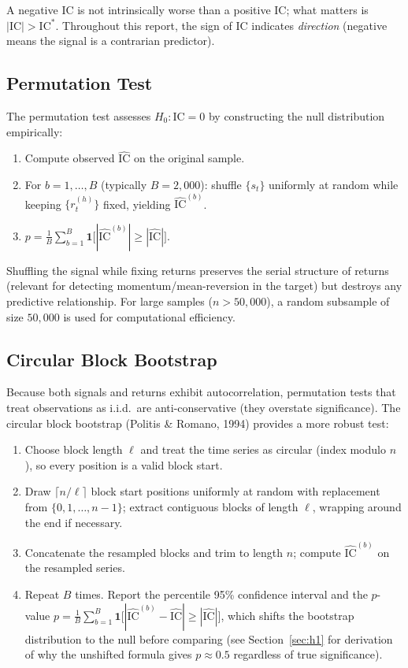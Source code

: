 \documentclass[12pt, a4paper]{article}
\theoremstyle{definition}
\newcommand{\IC}{\mathrm{IC}}
\begin{document}
A negative IC is not intrinsically worse than a positive IC; what matters is
$|\IC| > \IC^*$. Throughout this report, the sign of IC indicates
\emph{direction} (negative means the signal is a contrarian predictor).

\subsection{Permutation Test}

The permutation test assesses $H_0 : \IC = 0$ by constructing the null
distribution empirically:

\begin{enumerate}
  \item Compute observed $\widehat{\IC}$ on the original sample.
  \item For $b = 1,\ldots,B$ (typically $B = 2{,}000$): shuffle $\{s_t\}$
        uniformly at random while keeping $\{r_t^{(h)}\}$ fixed, yielding
        $\widehat{\IC}^{(b)}$.
  \item $p = \frac{1}{B}\sum_{b=1}^B \mathbf{1}\bigl[|\widehat{\IC}^{(b)}|
        \geq |\widehat{\IC}|\bigr]$.
\end{enumerate}

Shuffling the signal while fixing returns preserves the serial structure of
returns (relevant for detecting momentum/mean-reversion in the target) but
destroys any predictive relationship. For large samples ($n > 50{,}000$),
a random subsample of size $50{,}000$ is used for computational efficiency.

\subsection{Circular Block Bootstrap}

Because both signals and returns exhibit autocorrelation, permutation tests
that treat observations as i.i.d.\ are anti-conservative (they overstate
significance). The circular block bootstrap (Politis \& Romano, 1994) provides a
more robust test:

\begin{enumerate}
  \item Choose block length $\ell$ and treat the time series as circular
        (index modulo $n$), so every position is a valid block start.
  \item Draw $\lceil n/\ell \rceil$ block start positions uniformly at random
        with replacement from $\{0, 1, \ldots, n-1\}$; extract contiguous
        blocks of length $\ell$, wrapping around the end if necessary.
  \item Concatenate the resampled blocks and trim to length $n$; compute
        $\widehat{\IC}^{(b)}$ on the resampled series.
  \item Repeat $B$ times.  Report the percentile 95\% confidence interval
        and the $p$-value
        $p = \frac{1}{B}\sum_{b=1}^B \mathbf{1}\bigl[|\widehat{\IC}^{(b)}
        - \widehat{\IC}| \geq |\widehat{\IC}|\bigr]$,
        which shifts the bootstrap distribution to the null
        before comparing (see Section~\ref{sec:h1} for derivation of why
        the unshifted formula gives $p \approx 0.5$ regardless of
        true significance).
\end{enumerate}
\end{document}
